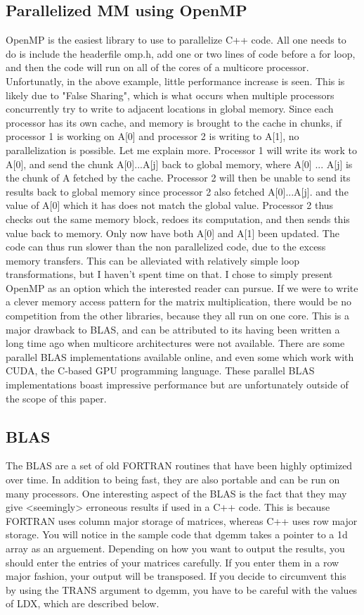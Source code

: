\subsection{Parallelized MM using OpenMP}
OpenMP is the easiest library to use to parallelize C++ code. All one needs to do is include the headerfile omp.h, add one or two lines of code before a for loop, and then the code will run on all of the cores of a multicore processor. Unfortunatly, in the above example, little performance increase is seen. This is likely due to "False Sharing", which is what occurs when multiple processors concurrently try to write to adjacent locations in global memory. Since each processor has its own cache, and memory is brought to the cache in chunks, if processor 1 is working on A[0] and processor 2 is writing to A[1], no parallelization is possible. Let me explain more.
	Processor 1 will write its work to A[0], and send the chunk A[0]...A[j] back to global memory, where A[0] ... A[j] is the chunk of A fetched by the cache. Processor 2 will then be unable to send its results back to global memory since processor 2 also fetched A[0]...A[j]. and the value of A[0] which it has does not match the global value. Processor 2 thus checks out the same memory block, redoes its computation, and then sends this value back to memory. Only now have both A[0] and A[1] been updated. The code can thus run slower than the non parallelized code, due to the excess memory transfers. This can be alleviated with relatively simple loop transformations, but I haven't spent time on that. I chose to simply present OpenMP as an option which the interested reader can pursue. 
	If we were to write a clever memory access pattern for the matrix multiplication, there would be no competition from the other libraries, because they all run on one core. This is a major drawback to BLAS, and can be attributed to its having been written a long time ago when multicore architectures were not available. There are some parallel BLAS implementations available online, and even some which work with CUDA, the C-based GPU programming language. These parallel BLAS implementations boast impressive performance but are unfortunately outside of the scope of this paper.

\subsection{BLAS}
The BLAS are a set of old FORTRAN routines that have been highly optimized over time. In addition to being fast, they are also portable and can be run on many processors. One interesting aspect of the BLAS is the fact that they may give <seemingly> erroneous results if used in a C++ code. This is because FORTRAN uses column major storage of matrices, whereas C++ uses row major storage. You will notice in the sample code that dgemm takes a pointer to a 1d array as an arguement. Depending on how you want to output the results, you should enter the entries of your matrices carefully. If you enter them in a row major fashion, your output will be transposed. If you decide to circumvent this by using the TRANS argument to dgemm, you have to be careful with the values of LDX, which are described below.


